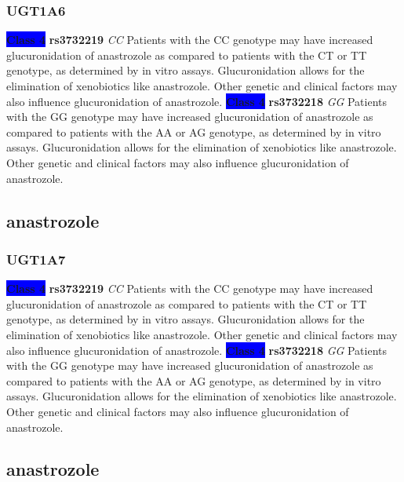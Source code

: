 \documentclass{book}
\begin{document}
\subsubsection{ UGT1A6 }

\begin{center}

\textbf{\colorbox{blue} {Class 4}} \textbf{ rs3732219 } \textit{ CC }
Patients with the CC genotype may have increased glucuronidation of anastrozole as compared to patients with the CT or TT genotype, as determined by in vitro assays. Glucuronidation allows for the elimination of xenobiotics like anastrozole. Other genetic and clinical factors may also influence glucuronidation of anastrozole. \textbf{\colorbox{blue} {Class 4}} \textbf{ rs3732218 } \textit{ GG }
Patients with the GG genotype may have increased glucuronidation of anastrozole as compared to patients with the AA or AG genotype, as determined by in vitro assays. Glucuronidation allows for the elimination of xenobiotics like anastrozole. Other genetic and clinical factors may also influence glucuronidation of anastrozole.

\end{center}\subsection{ anastrozole }


\subsubsection{ UGT1A7 }

\begin{center}

\textbf{\colorbox{blue} {Class 4}} \textbf{ rs3732219 } \textit{ CC }
Patients with the CC genotype may have increased glucuronidation of anastrozole as compared to patients with the CT or TT genotype, as determined by in vitro assays. Glucuronidation allows for the elimination of xenobiotics like anastrozole. Other genetic and clinical factors may also influence glucuronidation of anastrozole. \textbf{\colorbox{blue} {Class 4}} \textbf{ rs3732218 } \textit{ GG }
Patients with the GG genotype may have increased glucuronidation of anastrozole as compared to patients with the AA or AG genotype, as determined by in vitro assays. Glucuronidation allows for the elimination of xenobiotics like anastrozole. Other genetic and clinical factors may also influence glucuronidation of anastrozole.

\end{center}\subsection{ anastrozole }
\end{document}
